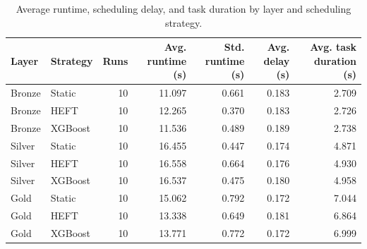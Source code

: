 \begin{table}
\caption{Average runtime, scheduling delay, and task duration by layer and scheduling strategy.}
\label{tab:runtime-summary}
\begin{tabular}{llrrrrr}
\toprule
Layer & Strategy & Runs & Avg. runtime (s) & Std. runtime (s) & Avg. delay (s) & Avg. task duration (s) \\
\midrule
Bronze & Static & 10 & 11.097 & 0.661 & 0.183 & 2.709 \\
Bronze & HEFT & 10 & 12.265 & 0.370 & 0.183 & 2.726 \\
Bronze & XGBoost & 10 & 11.536 & 0.489 & 0.189 & 2.738 \\
Silver & Static & 10 & 16.455 & 0.447 & 0.174 & 4.871 \\
Silver & HEFT & 10 & 16.558 & 0.664 & 0.176 & 4.930 \\
Silver & XGBoost & 10 & 16.537 & 0.475 & 0.180 & 4.958 \\
Gold & Static & 10 & 15.062 & 0.792 & 0.172 & 7.044 \\
Gold & HEFT & 10 & 13.338 & 0.649 & 0.181 & 6.864 \\
Gold & XGBoost & 10 & 13.771 & 0.772 & 0.172 & 6.999 \\
\bottomrule
\end{tabular}
\end{table}
